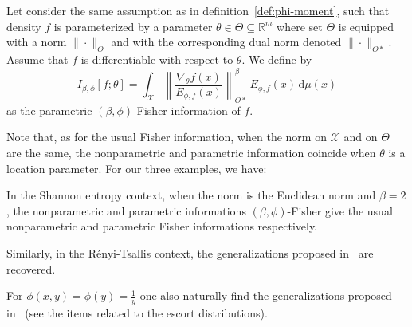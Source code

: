 \documentclass[entropy,article,submit,moreauthors,pdftex]{Definitions/mdpi}
\newcounter{GaussExample}%
\newcounter{qGaussExample}%
\newcounter{arcsineExample}%
\newcommand{\SZ}[1]{{\color{blue} #1}}                                       %
\def\dmu{\mathrm{d}\mu}%
\def\Rset{\mathbb{R}}%
\def\X{\mathcal{X}}%
\begin{document}
\begin{Definition}
\label{def:p-phi-Fisher}
%
  Let consider  the same assumption as  in definition~\ref{def:phi-moment}, such
  that density $f$ is parameterized by  a parameter $\theta \in \Theta \subseteq
  \Rset^m$  \SZ{where  set}   $\Theta$  is  equipped  with  a   norm  $\|  \cdot
  \|_{\Theta}$  and \SZ{with}  the  corresponding dual  norm  denoted $\|  \cdot
  \|_{\Theta*}$.  Assume that $f$ is differentiable with respect to $\theta$. We
  define by
  \begin{equation}\label{eq:p-phi-Fisher}
  I_{\beta,\phi}[f;\theta] = \int_\X \left\| \frac{\nabla_\theta
  f(x)}{E_{\phi,f}(x)} \right\|_{\Theta*}^\beta \, E_{\phi,f}(x) \, \dmu(x)
  \end{equation}
  as the parametric $(\beta,\phi)$-Fisher information of $f$.
\end{Definition}
%
Note that,  as for the usual  Fisher information, when  the norm on $\X$  and on
$\Theta$ are  the same,  the nonparametric  and parametric  information coincide
when $\theta$ is a location parameter. For our three examples, we have:
%
%
\begin{Example}
  In the Shannon entropy context, when the norm is the Euclidean norm and $\beta
  = 2$, the nonparametric and parametric informations $(\beta,\phi)$-Fisher give
  the usual nonparametric and parametric Fisher informations respectively.
\end{Example}
%
\begin{Example}
  Similarly,  in  the  R\'enyi-Tsallis  context,  the  generalizations  proposed
  in~\cite{Ber12:06_1, Ber12:06_2, Ber13} are recovered.
\end{Example}
%
\begin{Example}
  For  $\phi(x,y)  =  \phi(y)  =   \frac{1}{y}$  one  also  naturally  find  the
  generalizations  proposed  in~\cite{Ber12:06_1,  Ber12:06_2, Ber13}  (see  the
  items related to the escort distributions).
\end{Example}

\
\end{document}
